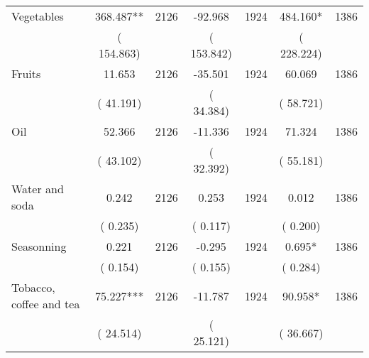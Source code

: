 \begin{tabular}{l*{6}{c}}
Vegetables        &            368.487**      &       2126       &            -92.968      &       1924       &            484.160*      &       1386       \\
                       &       (     154.863)            &                               &       (     153.842)            &                               &       (     228.224)            &                               \\
Fruits        &             11.653      &       2126       &            -35.501      &       1924       &             60.069      &       1386       \\
                       &       (      41.191)            &                               &       (      34.384)            &                               &       (      58.721)            &                               \\
Oil        &             52.366      &       2126       &            -11.336      &       1924       &             71.324      &       1386       \\
                       &       (      43.102)            &                               &       (      32.392)            &                               &       (      55.181)            &                               \\
Water and soda        &              0.242      &       2126       &              0.253      &       1924       &              0.012      &       1386       \\
                       &       (       0.235)            &                               &       (       0.117)            &                               &       (       0.200)            &                               \\
Seasonning        &              0.221      &       2126       &             -0.295      &       1924       &              0.695*      &       1386       \\
                       &       (       0.154)            &                               &       (       0.155)            &                               &       (       0.284)            &                               \\
Tobacco, coffee and tea        &             75.227***      &       2126       &            -11.787      &       1924       &             90.958*      &       1386       \\
                       &       (      24.514)            &                               &       (      25.121)            &                               &       (      36.667)            &                               \\

\end{tabular}
